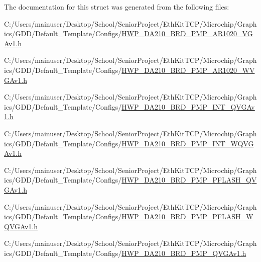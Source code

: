 The documentation for this struct was generated from the following files\+:\begin{DoxyCompactItemize}
\item 
C\+:/\+Users/mainuser/\+Desktop/\+School/\+Senior\+Project/\+Eth\+Kit\+T\+C\+P/\+Microchip/\+Graphics/\+G\+D\+D/\+Default\+\_\+\+Template/\+Configs/\hyperlink{_h_w_p___d_a210___b_r_d__16_p_m_p___a_r1020___v_g_av1_8h}{H\+W\+P\+\_\+\+D\+A210\+\_\+\+B\+R\+D\+\_\+P\+M\+P\+\_\+\+A\+R1020\+\_\+\+V\+G\+Av1.\+h}\item 
C\+:/\+Users/mainuser/\+Desktop/\+School/\+Senior\+Project/\+Eth\+Kit\+T\+C\+P/\+Microchip/\+Graphics/\+G\+D\+D/\+Default\+\_\+\+Template/\+Configs/\hyperlink{_h_w_p___d_a210___b_r_d__16_p_m_p___a_r1020___w_v_g_av1_8h}{H\+W\+P\+\_\+\+D\+A210\+\_\+\+B\+R\+D\+\_\+P\+M\+P\+\_\+\+A\+R1020\+\_\+\+W\+V\+G\+Av1.\+h}\item 
C\+:/\+Users/mainuser/\+Desktop/\+School/\+Senior\+Project/\+Eth\+Kit\+T\+C\+P/\+Microchip/\+Graphics/\+G\+D\+D/\+Default\+\_\+\+Template/\+Configs/\hyperlink{_h_w_p___d_a210___b_r_d__16_p_m_p___i_n_t___q_v_g_av1_8h}{H\+W\+P\+\_\+\+D\+A210\+\_\+\+B\+R\+D\+\_\+P\+M\+P\+\_\+\+I\+N\+T\+\_\+\+Q\+V\+G\+Av1.\+h}\item 
C\+:/\+Users/mainuser/\+Desktop/\+School/\+Senior\+Project/\+Eth\+Kit\+T\+C\+P/\+Microchip/\+Graphics/\+G\+D\+D/\+Default\+\_\+\+Template/\+Configs/\hyperlink{_h_w_p___d_a210___b_r_d__16_p_m_p___i_n_t___w_q_v_g_av1_8h}{H\+W\+P\+\_\+\+D\+A210\+\_\+\+B\+R\+D\+\_\+P\+M\+P\+\_\+\+I\+N\+T\+\_\+\+W\+Q\+V\+G\+Av1.\+h}\item 
C\+:/\+Users/mainuser/\+Desktop/\+School/\+Senior\+Project/\+Eth\+Kit\+T\+C\+P/\+Microchip/\+Graphics/\+G\+D\+D/\+Default\+\_\+\+Template/\+Configs/\hyperlink{_h_w_p___d_a210___b_r_d__16_p_m_p___p_f_l_a_s_h___q_v_g_av1_8h}{H\+W\+P\+\_\+\+D\+A210\+\_\+\+B\+R\+D\+\_\+P\+M\+P\+\_\+\+P\+F\+L\+A\+S\+H\+\_\+\+Q\+V\+G\+Av1.\+h}\item 
C\+:/\+Users/mainuser/\+Desktop/\+School/\+Senior\+Project/\+Eth\+Kit\+T\+C\+P/\+Microchip/\+Graphics/\+G\+D\+D/\+Default\+\_\+\+Template/\+Configs/\hyperlink{_h_w_p___d_a210___b_r_d__16_p_m_p___p_f_l_a_s_h___w_q_v_g_av1_8h}{H\+W\+P\+\_\+\+D\+A210\+\_\+\+B\+R\+D\+\_\+P\+M\+P\+\_\+\+P\+F\+L\+A\+S\+H\+\_\+\+W\+Q\+V\+G\+Av1.\+h}\item 
C\+:/\+Users/mainuser/\+Desktop/\+School/\+Senior\+Project/\+Eth\+Kit\+T\+C\+P/\+Microchip/\+Graphics/\+G\+D\+D/\+Default\+\_\+\+Template/\+Configs/\hyperlink{_h_w_p___d_a210___b_r_d__16_p_m_p___q_v_g_av1_8h}{H\+W\+P\+\_\+\+D\+A210\+\_\+\+B\+R\+D\+\_\+P\+M\+P\+\_\+\+Q\+V\+G\+Av1.\+h}\item 

\end{DoxyCompactItemize}
